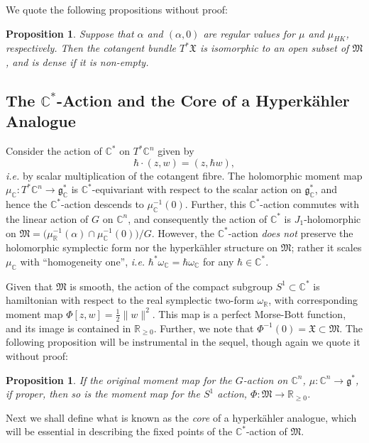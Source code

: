\documentclass{article}
\newtheorem{prop}[theorem]{Proposition}
\newcommand{\ie}{\emph{i.e.} }
\newcommand{\w}{\omega}
\newcommand{\m}{\mu}
\newcommand{\HK}{hyperk\"ahler }
\newcommand{\RR}{\mathbb{R}}
\newcommand{\CC}{\mathbb{C}}
\newcommand{\mf}[1]{\mathfrak{#1}}
\begin{document}
	We quote the following propositions without proof:
	
	\begin{prop}
		Suppose that $\alpha$ and $(\alpha,0)$ are regular values for $\mu$ and $\mu_{HK}$, respectively. Then the cotangent bundle $T^{\ast}\mf{X}$ is isomorphic to an open subset of $\mf{M}$, and is dense if it is non-empty.
	\end{prop}
	
	\subsection{The $\CC^{\ast}$-Action and the Core of a Hyperk{\"a}hler Analogue}
	
	Consider the action of $\CC^{\ast}$ on $T^{\ast}\CC^{n}$ given by
	$$
	\hbar \cdot (z,w) = (z,\hbar w),
	$$
	\ie by scalar multiplication of the cotangent fibre. The holomorphic moment map $\mu_{\CC}:T^{\ast}\CC^{n} \rightarrow \mf{g}_{\CC}^{\ast}$ is $\CC^{\ast}$-equivariant with respect to the scalar action on $\mf{g}_{\CC}^{\ast}$, and hence the $\CC^{\ast}$-action descends to $\mu_{\CC}^{-1}(0)$. Further, this $\CC^{\ast}$-action commutes with the linear action of $G$ on $\CC^{n}$, and consequently the action of $\CC^{\ast}$ is $J_{1}$-holomorphic on $\mf{M} = \big(\mu_{\RR}^{-1}(\alpha) \cap \mu_{\CC}^{-1}(0)\big)/G$. However, the $\CC^{\ast}$-action \emph{does not} preserve the holomorphic symplectic form nor the \HK structure on $\mf{M}$; rather it scales $\m_{\CC}$ with ``homogeneity one'', \ie $\hbar^{\ast}\w_{\CC} = \hbar \w_{\CC}$ for any $\hbar\in \CC^{\ast}$.
	
	Given that $\mf{M}$ is smooth, the action of the compact subgroup $S^{1} \subset \CC^{\ast}$ is hamiltonian with respect to the real symplectic two-form $\w_{\RR}$, with corresponding moment map $\Phi[z,w] = \tfrac{1}{2}\|w\|^{2}$. This map is a perfect Morse-Bott function, and its image is contained in $\RR_{\geq 0}$. Further, we note that $\Phi^{-1}(0) = \mf{X} \subset \mf{M}$. The following proposition will be instrumental in the sequel, though again we quote it without proof:
	
	\begin{prop}
		If the original moment map for the $G$-action on $\CC^{n}$, $\mu: \CC^{n} \rightarrow \mf{g}^{\ast}$, if proper, then so is the moment map for the $S^{1}$ action, $\Phi:\mf{M} \rightarrow \RR_{\geq 0}$.
	\end{prop}
	
	Next we shall define what is known as the \emph{core} of a \HK analogue, which will be essential in describing the fixed points of the $\CC^{\ast}$-action of $\mf{M}$.
	
\end{document}

